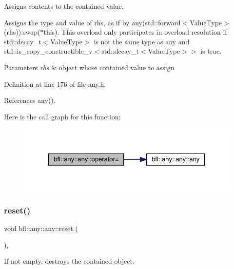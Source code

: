 Assigns contents to the contained value. 

Assigns the type and value of rhs, as if by any(std\+::forward$<$\+Value\+Type$>$(rhs)).swap($\ast$this). This overload only participates in overload resolution if std\+::decay\+\_\+t$<$\+Value\+Type$>$ is not the same type as any and std\+::is\+\_\+copy\+\_\+constructible\+\_\+v$<$std\+::decay\+\_\+t$<$\+Value\+Type$>$$>$ is true.


\begin{DoxyParams}{Parameters}
{\em rhs} & object whose contained value to assign \\
\hline
\end{DoxyParams}


Definition at line 176 of file any.\+h.



References any().

Here is the call graph for this function\+:
\nopagebreak
\begin{figure}[H]
\begin{center}
\leavevmode
\includegraphics[width=326pt]{classbfl_1_1any_1_1any_a62a6777ca18bd10bf05ffa0f6d131435_cgraph}
\end{center}
\end{figure}
\mbox{\label{classbfl_1_1any_1_1any_ae4e063fb12711ea99a78bdab4d5c3e36}} 
\subsubsection{\texorpdfstring{reset()}{reset()}}
{\footnotesize\ttfamily void bfl\+::any\+::any\+::reset (\begin{DoxyParamCaption}{ }\end{DoxyParamCaption})\hspace{0.3cm}{\ttfamily [inline]}, {\ttfamily [noexcept]}}



If not empty, destroys the contained object. 



